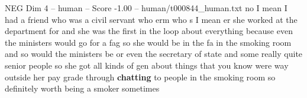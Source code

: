 \begin{textsample}{NEG Dim 4 – human – Score -1.00 – human/t000844\_human.txt}  \label{ex:f4_neg_040}
no I mean I had a friend who was a civil servant who erm who s I mean er she worked at the department for and she was the first in the loop about everything because even the ministers would go for a fag so she would be in the fa in the smoking room and so would the ministers be or even the secretary of state and some really quite senior people so she got all kinds of gen about things that you know were way outside her pay grade through \textbf{chatting} to people in the smoking room so definitely worth being a smoker sometimes

\end{textsample}

